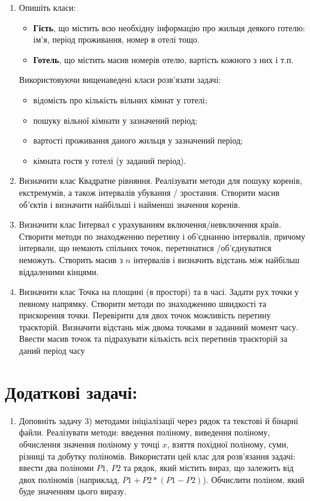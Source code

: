 \documentclass[a5paper,titlepage,openany,twoside,draft]{book_unv}%
\begin{document}
\begin{enumerate}
\item
Опишіть класи:
\begin{itemize}
\item
\textbf{Гість}, що містить всю необхідну інформацію про жильця
деякого готелю: ім'я, період проживання, номер в отелі тощо.
\item
\textbf{Готель}, що містить масив номерів отелю, вартість кожного з них і т.п.
\end{itemize}
Використовуючи вищенаведені класи розв'язати задачі:
\begin{itemize}
\item відомість про кількість вільних кімнат у готелі;
\item пошуку вільної кімнати у зазначений період;
\item вартості проживання даного жильця у зазначений період;
\item кімната гостя у готелі (у заданий період).
\end{itemize}

\item
Визначити клас Квадратне рівняння. Реалізувати методи для пошуку коренів,
екстремумів, а також інтервалів убування / зростання. Створити масив об'єктів і 
визначити найбільші і найменші значення коренів.
\item
Визначити клас Інтервал с урахуванням включення/невключення країв. 
Створити методи по знаходженню перетину і об'єднанню інтервалів, 
причому інтервали, що немають спільних точок, перетинатися /об'єднуватися неможуть. 
Створить масив з $n$ інтервалів і визначить відстань між найбільш віддаленими кінцями.

\item
Визначити клас Точка на площині (в просторі) та в часі. 
Задати рух точки у певному напрямку. Створити методи по знаходженню швидкості та прискорення точки. 
Перевірити для двох точок можливість перетину траєкторій. 
Визначити відстань між двома точками в заданний момент часу.
Ввести масив точок та підрахувати кількість всіх перетинів траєкторій за даний період часу

\end{enumerate}

\section{Додаткові задачі:}

\begin{enumerate}
\def\labelenumi{\arabic{enumi})}
\setcounter{enumi}{18}
\item
Доповніть задачу 3) методами ініціалізації через рядок та текстові й бінарні файли.
Реалізувати методи: введення поліному, виведення поліному, обчислення
значення поліному у точці $x$, взяття похідної поліному, суми, різниці та
добутку поліномів. Використати цей клас для розв'язання задачі: ввести два
поліноми $P1$, $P2$ та рядок, який містить вираз, що залежить від двох
поліномів (наприклад, $P1 + P2*(P1- P2) $). Обчислити поліном, який буде значенням цього виразу.

\end{enumerate}
\end{document}
